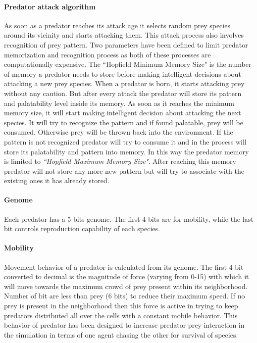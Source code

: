 \documentclass[letterpaper]{article}
\numberwithin{equation}{section}
\begin{document}
\paragraph{Predator attack algorithm}
As soon as a predator reaches its attack age it selects random prey species around its vicinity and starts attacking them. This attack process also involves recognition of prey pattern. Two parameters have been defined to limit predator memorization and recognition process as both of these processes are computationally expensive. The ``Hopfield Minimum Memory Size" is the number of memory a predator needs to store before making intelligent decisions about attacking a new prey species. When a predator is born, it starts attacking prey without any caution. But after every attack the predator will store its pattern and palatability level inside its memory. As soon as it reaches the minimum memory size, it will start making intelligent decision about attacking the next species. It will try to recognize the pattern and if found palatable, prey will be consumed. Otherwise prey will be thrown back into the environment. If the pattern is not recognized predator will try to consume it and in the process will store its palatability and pattern into memory. In this way the predator memory is limited to \textsl{``Hopfield Maximum Memory Size"}. After reaching this memory predator will not store any more new pattern but will try to associate with the existing ones it has already stored.

\paragraph{Genome}
Each predator has a 5 bits genome. The first 4 bits are for mobility, while the last bit controls reproduction capability of each species.

\paragraph{Mobility}
Movement behavior of a predator is calculated from its genome. The first 4 bit converted to decimal is the magnitude of force (varying from 0-15) with which it will move towards the maximum crowd of prey present within its neighborhood. Number of bit are less than prey (6 bits) to reduce their maximum speed. If no prey is present in the neighborhood then this force is active in trying to keep predators distributed all over the cells with a constant mobile behavior. This behavior of predator has been designed to increase predator prey interaction in the simulation in terms of one agent chasing the other for survival of species. 
\end{document}
